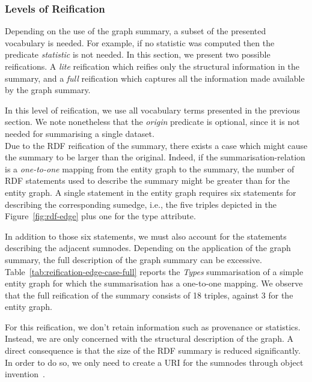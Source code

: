 \subsubsection{Levels of Reification}

Depending on the use of the graph summary, a subset of the presented vocabulary is needed. For example, if no statistic was computed then the predicate \emph{statistic} is not needed. In this section, we present two possible reifications. A \emph{lite} reification which reifies only the structural information in the summary, and a \emph{full} reification which captures all the information made available by the graph summary.


In this level of reification, we use all vocabulary terms presented in the previous section. We note nonetheless that the \emph{origin} predicate is optional, since it is not needed for summarising a single dataset.\\

Due to the RDF reification of the summary, there exists a case which might cause the summary to be larger than the original. Indeed, if the \gls{summarisation-relation} is a \emph{one-to-one} mapping from the entity graph to the summary, the number of RDF statements used to describe the summary might be greater than for the entity graph. A single statement in the entity graph requires six statements for describing the corresponding sumedge, i.e., the five triples depicted in the Figure~\ref{fig:rdf-edge} plus one for the type attribute.

In addition to those six statements, we must also account for the statements describing the adjacent sumnodes. Depending on the application of the graph summary, the full description of the graph summary can be excessive.\\

Table~\ref{tab:reification-edge-case-full} reports the \emph{Types} summarisation of a simple entity graph for which the summarisation has a one-to-one mapping. We observe that the full reification of the summary consists of 18 triples, against 3 for the entity graph.


For this reification, we don't retain information such as provenance or statistics. Instead, we are only concerned with the structural description of the graph. A direct consequence is that the size of the RDF summary is reduced significantly. In order to do so, we only need to create a URI for the sumnodes through object invention~\cite{hull:1989:usi}.

